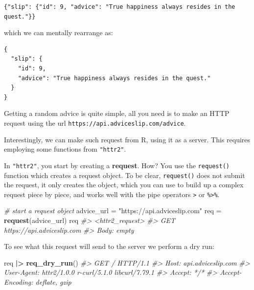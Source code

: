 \documentclass[
]{book}
\newenvironment{Shaded}{\begin{snugshade}}{\end{snugshade}}
\newcommand{\CommentTok}[1]{\textcolor[rgb]{0.56,0.35,0.01}{\textit{#1}}}
\newcommand{\FunctionTok}[1]{\textcolor[rgb]{0.13,0.29,0.53}{\textbf{#1}}}
\newcommand{\NormalTok}[1]{#1}
\newcommand{\OtherTok}[1]{\textcolor[rgb]{0.56,0.35,0.01}{#1}}
\newcommand{\SpecialCharTok}[1]{\textcolor[rgb]{0.81,0.36,0.00}{\textbf{#1}}}
\newcommand{\StringTok}[1]{\textcolor[rgb]{0.31,0.60,0.02}{#1}}
\begin{document}
\begin{verbatim}
{"slip": {"id": 9, "advice": "True happiness always resides in the quest."}}
\end{verbatim}

which we can mentally rearrange as:

\begin{verbatim}
{
  "slip": {
    "id": 9, 
    "advice": "True happiness always resides in the quest."
  }
}
\end{verbatim}

Getting a random advice is quite simple, all you need is to make an HTTP
request using the url \texttt{https://api.adviceslip.com/advice}.

Interestingly, we can make such request from R, using it as a server. This
requires employing some functions from \texttt{"httr2"}.

In \texttt{"httr2"}, you start by creating a \textbf{request}. How? You use the \texttt{request()}
function which creates a request object. To be clear, \texttt{request()} does not
submit the request, it only creates the object, which you can use to build up a
complex request piece by piece, and works well with the pipe operators \texttt{\textbar{}\textgreater{}}
or \texttt{\%\textgreater{}\%}.

\begin{Shaded}
\begin{Highlighting}[]
\CommentTok{\# start a request object}
\NormalTok{advice\_url }\OtherTok{=} \StringTok{"https://api.adviceslip.com"}
\NormalTok{req }\OtherTok{=} \FunctionTok{request}\NormalTok{(advice\_url)}
\NormalTok{req}
\CommentTok{\#\textgreater{} \textless{}httr2\_request\textgreater{}}
\CommentTok{\#\textgreater{} GET https://api.adviceslip.com}
\CommentTok{\#\textgreater{} Body: empty}
\end{Highlighting}
\end{Shaded}

To see what this request will send to the server we perform a dry run:

\begin{Shaded}
\begin{Highlighting}[]
\NormalTok{req }\SpecialCharTok{|\textgreater{}} \FunctionTok{req\_dry\_run}\NormalTok{()}
\CommentTok{\#\textgreater{} GET / HTTP/1.1}
\CommentTok{\#\textgreater{} Host: api.adviceslip.com}
\CommentTok{\#\textgreater{} User{-}Agent: httr2/1.0.0 r{-}curl/5.1.0 libcurl/7.79.1}
\CommentTok{\#\textgreater{} Accept: */*}
\CommentTok{\#\textgreater{} Accept{-}Encoding: deflate, gzip}
\end{Highlighting}
\end{Shaded}
\end{document}
